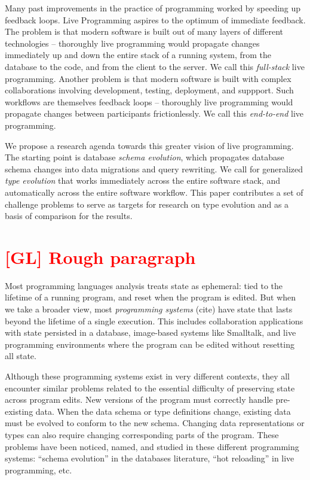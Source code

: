 \documentclass[english,submission]{programming}
\begin{document}
Many past improvements in the practice of programming worked by speeding up feedback loops. Live Programming aspires to the optimum of immediate feedback. The problem is that modern software is built out of many layers of different technologies -- thoroughly live programming would propagate changes immediately up and down the entire stack of a running system, from the database to the code, and from the client to the server. We call this \textit{full-stack} live programming. Another problem is that modern software is built with complex collaborations involving development, testing, deployment, and suppport. Such workflows are themselves feedback loops -- thoroughly live programming would propagate changes between participants frictionlessly. We call this \textit{end-to-end} live programming.

We propose a research agenda towards this greater vision of live programming. The starting point is database \textit{schema evolution}, which propagates database schema changes into data migrations and query rewriting. We call for generalized \textit{type evolution} that works immediately across the entire software stack, and automatically across the entire software workflow. This paper contributes a set of challenge problems to serve as targets for research on type evolution and as a basis of comparison for the results.

\section{\textcolor{red}{[GL] Rough paragraph}}

Most programming languages analysis treats state as ephemeral: tied to the lifetime of a running program, and reset when the program is edited. But when we take a broader view, most \textit{programming systems} (cite) have state that lasts beyond the lifetime of a single execution. This includes collaboration applications with state persisted in a database, image-based systems like Smalltalk, and live programming environments where the program can be edited without resetting all state.

Although these programming systems exist in very different contexts, they all encounter similar problems related to the essential difficulty of preserving state across program edits. New versions of the program must correctly handle pre-existing data. When the data schema or type definitions change, existing data must be evolved to conform to the new schema. Changing data representations or types can also require changing corresponding parts of the program. These problems have been noticed, named, and studied in these different programming systems: ``schema evolution'' in the databases literature, ``hot reloading'' in live programming, etc.
\end{document}
